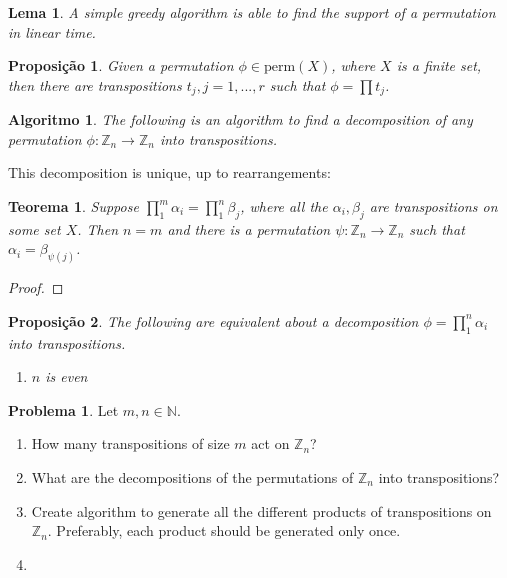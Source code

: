 \documentclass[]{article}
\newtheorem{theorem}{Teorema}[section]
\newtheorem{proposition}{Proposição}[section]
\newtheorem{lemma}{Lema}[section]
\newtheorem{algo}{Algoritmo}[section]
\theoremstyle{definition}
\newtheorem{problem}{Problema}[section]
\theoremstyle{definition}
\newcommand{\raw}{\rightarrow}
\newcommand{\bb}{\mathbb}
\begin{document}
\begin{lemma}
	A simple greedy algorithm is able to find the support of a permutation in linear time.	
\end{lemma}

\begin{proposition}
	Given a permutation $\phi \in \text{perm}(X)$, where $X$ is a finite set, then there are transpositions $t_j, j=1,...,r$ such that $\phi = \prod t_j$.
\end{proposition}

\begin{algo}
	The following is an algorithm to find a decomposition of any permutation $\phi: \bb{Z}_n \raw \bb{Z}_n$ into transpositions.
	
	
	
\end{algo}

This decomposition is unique, up to rearrangements:

\begin{theorem}
	Suppose $\prod_1^{m}\alpha_i=\prod_{1}^{n}\beta_j$, where all the $\alpha_i, \beta_j$ are transpositions on some set $X$. Then $n=m$ and there is a permutation $\psi:\bb{Z}_n\raw\bb{Z}_n$ such that $\alpha_i = \beta_{\psi(j)}$.
\end{theorem}
\begin{proof}
	
\end{proof}

\begin{proposition}
	The following are equivalent about a decomposition $\phi = \prod_{1}^n\alpha_i$ into transpositions.
	
	\begin{enumerate}
		\item $n$ is even
	\end{enumerate}
\end{proposition}

\begin{problem}
	Let $m, n \in \bb{N}$.
	\begin{enumerate}
		\item How many transpositions of size $m$ act on $\bb{Z}_n$?
		
		\item 	What are the decompositions of the permutations of $\bb{Z}_n$ into transpositions?
		
		\item Create algorithm to generate all the different products of transpositions on $\bb{Z}_n$. Preferably, each product should be generated only once.
		
		\item  
	\end{enumerate}
	

\end{problem}
\end{document}
